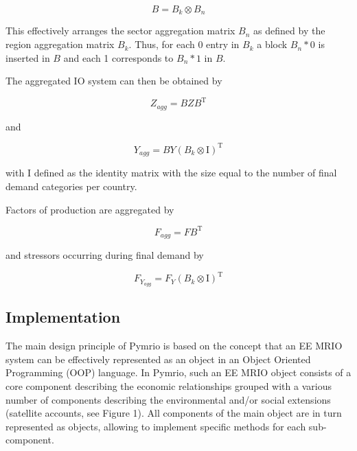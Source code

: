 \documentclass{jors}
\begin{document}
{\begin{equation}
    B = B_k \otimes B_n
\end{equation}

This effectively arranges the sector aggregation matrix $B_n$ as defined by
the region aggregation matrix $B_k$. Thus, for each 0 entry in $B_k$ a block
$B_n * 0$ is inserted in $B$ and each 1 corresponds to $B_n * 1$ in $B$.

The aggregated IO system can then be obtained by

\begin{equation}
    Z_{agg} = BZB^\mathrm{T} 
\end{equation}

and

\begin{equation}
    Y_{agg} = BY(B_k \otimes \mathrm{I})^\mathrm{T}
\end{equation}

with $\mathrm{I}$ defined as the identity matrix with the size equal to the number of final demand
categories per country.

Factors of production are aggregated by

\begin{equation}
    F_{agg} = FB^\mathrm{T} 
\end{equation}

and stressors occurring during final demand by

\begin{equation}
    F_Y_{agg} = F_Y(B_k \otimes \mathrm{I})^\mathrm{T}
\end{equation}

}

\subsection*{Implementation}


The main design principle of Pymrio is based on the concept that an EE MRIO system can be effectively represented as an object in an Object Oriented Programming (OOP) language.
In Pymrio, such an EE MRIO object consists of a core component describing the economic relationships grouped with a various number of components describing the environmental and/or social extensions (satellite accounts, see Figure 1). 
All components of the main object are in turn represented as objects, allowing to implement specific methods for each sub-component.
\end{document}
